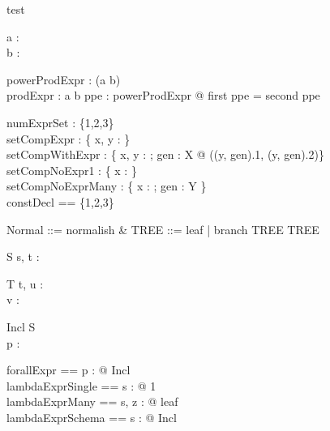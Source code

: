 \begin{zsection}
 \SECTION test
\end{zsection}

\begin{axdef}
  a : \power \nat\\
  b : \power \nat
\end{axdef}

\begin{axdef}
  powerProdExpr : \power (a \cross b)\\
  prodExpr : a \cross b
\where
  \forall ppe : powerProdExpr @ first ppe = second ppe
\end{axdef}

\begin{gendef}[X, Y]
  numExprSet : \{1,2,3\}\\
  setCompExpr : \power \{ x, y : \nat \}\\
  setCompWithExpr : \{ x, y : \nat ; gen : X @ ((y, gen).1, (y, gen).2)\}\\
  setCompNoExpr1 : \{ x : \nat \}\\
  setCompNoExprMany : \{ x : \nat; gen : Y \}\\
  constDecl == \{1,2,3\}
\end{gendef}

\begin{zed}
  Normal ::= normalish \ldata \nat \rdata &
  TREE ::= leaf | branch \ldata \nat \cross TREE \cross TREE \rdata
\end{zed}

\begin{schema}{S}
  s, t : \nat
\end{schema}

\begin{schema}{T}
  t, u : \nat\\
  v : \power \nat
\end{schema}

\begin{schema}{Incl}
  S\\
  p : \nat
\end{schema}

\begin{zed}
  forallExpr == \forall p : \nat @ Incl\\
  lambdaExprSingle == \lambda s : \nat @ 1\\
  lambdaExprMany == \lambda s, z : \nat @ leaf\\
  lambdaExprSchema == \lambda s : \nat @ Incl\\
\end{zed}

